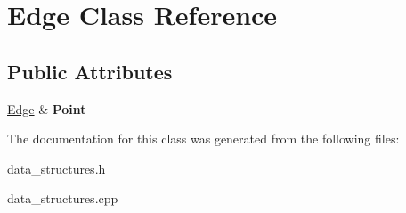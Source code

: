 \hypertarget{class_edge}{}\section{Edge Class Reference}
\label{class_edge}
\subsection*{Public Attributes}
\begin{DoxyCompactItemize}
\item 
\hypertarget{class_edge_a8867988d0b812b64525214ab85a067f8}{}\hyperlink{class_edge}{Edge} \& {\bfseries Point}\label{class_edge_a8867988d0b812b64525214ab85a067f8}

\end{DoxyCompactItemize}


The documentation for this class was generated from the following files\+:\begin{DoxyCompactItemize}
\item 
data\+\_\+structures.\+h\item 
data\+\_\+structures.\+cpp\end{DoxyCompactItemize}
